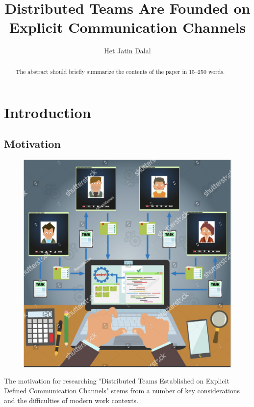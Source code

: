 \documentclass[runningheads]{llncs}
\begin{document}
%
\title{Distributed Teams Are Founded on Explicit
Communication Channels}
%
%
\author{Het Jatin Dalal}
%

%

%
%
\maketitle              %
%

\begin{abstract}
    The abstract should briefly summarize the contents of the paper in
    15--250 words.
    
    \end{abstract}
    \section{Introduction}
    \subsection{Motivation}

    \begin{figure}   
        \includegraphics[width=0.2\linewidth]{DTlogo.png}
    \end{figure}

    The motivation for researching "Distributed Teams Established on Explicit Defined Communication Channels" stems from a number of key considerations and the difficulties of modern work contexts.
    
\end{document}
